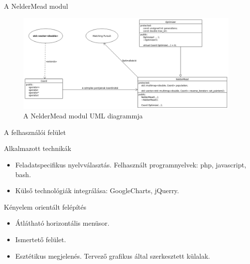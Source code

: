 \documentclass{beamer}
\begin{document}
\begin{frame}{A NelderMead modul}
\linespread{0.8}
\small
\vspace{-2mm}

\begin{figure}[H]
	\begin{center}
		\includegraphics[scale=0.25]{./figures/NelderMead.png}
		\caption{A NelderMead modul UML diagrammja}
	\end{center}	
\end{figure}

\end{frame}

\begin{frame}{A felhasználói felület}
\linespread{0.8}
\small
\vspace{-2mm}
\begin{block}{Alkalmazott technikák}
	\begin{itemize}
		\item Feladatspecifikus nyelvválasztás. Felhasznált programnyelvek: php, javascript, bash.
		\item Külső technológiák integrálása: GoogleCharts, jQuerry.
	\end{itemize}
	\end{block}		
	
\begin{block}{Kényelem orientált felépítés}
	\begin{itemize}
		\item Átlátható horizontális menüsor.
		\item Ismertető felület.
		\item Esztétikus megjelenés. Tervező grafikus által szerkesztett külalak. 
	\end{itemize}
\end{block}		

\end{frame}
\end{document}
